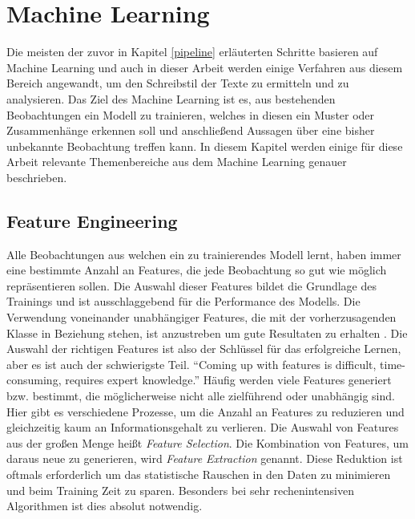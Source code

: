 \section{Machine Learning}
Die meisten der zuvor in Kapitel \ref{pipeline} erläuterten Schritte basieren auf Machine Learning und auch in dieser Arbeit werden einige Verfahren aus diesem Bereich angewandt, um den Schreibstil der Texte zu ermitteln und zu analysieren. Das Ziel des Machine Learning ist es, aus bestehenden Beobachtungen ein Modell zu trainieren, welches in diesen ein Muster oder Zusammenhänge erkennen soll und anschließend Aussagen über eine bisher unbekannte Beobachtung treffen kann. In diesem Kapitel werden einige für diese Arbeit relevante Themenbereiche aus dem Machine Learning genauer beschrieben.

\subsection{Feature Engineering}
Alle Beobachtungen aus welchen ein zu trainierendes Modell lernt, haben immer eine bestimmte Anzahl an Features, die jede Beobachtung so gut wie möglich repräsentieren sollen. Die Auswahl dieser Features bildet die Grundlage des Trainings und ist ausschlaggebend für die Performance des Modells. Die Verwendung voneinander unabhängiger Features, die mit der vorherzusagenden Klasse in Beziehung stehen, ist anzustreben um gute Resultaten zu erhalten \cite[Kap.~8]{domingos2012few}. Die Auswahl der richtigen Features ist also der Schlüssel für das erfolgreiche Lernen, aber es ist auch der schwierigste Teil. "`Coming up with features is difficult, time-consuming, requires expert knowledge."' \cite{ng2013machine} Häufig werden viele Features generiert bzw. bestimmt, die möglicherweise nicht alle zielführend oder unabhängig sind. Hier gibt es verschiedene Prozesse, um die Anzahl an Features zu reduzieren und gleichzeitig kaum an Informationsgehalt zu verlieren. Die Auswahl von Features aus der großen Menge heißt \emph{Feature Selection}. Die Kombination von Features, um daraus neue zu generieren, wird \emph{Feature Extraction} genannt. Diese Reduktion ist oftmals erforderlich um das statistische Rauschen in den Daten zu minimieren und beim Training Zeit zu sparen. Besonders bei sehr rechenintensiven Algorithmen ist dies absolut notwendig.

